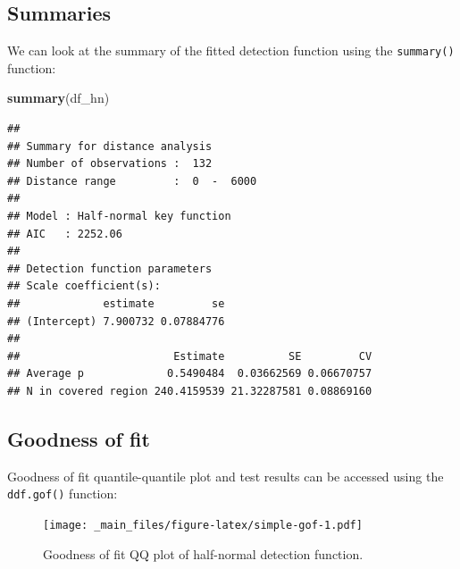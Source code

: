 \documentclass[]{book}
\newenvironment{Shaded}{\begin{snugshade}}{\end{snugshade}}
\newcommand{\KeywordTok}[1]{\textcolor[rgb]{0.13,0.29,0.53}{\textbf{#1}}}
\newcommand{\OperatorTok}[1]{\textcolor[rgb]{0.81,0.36,0.00}{\textbf{#1}}}
\newcommand{\NormalTok}[1]{#1}
\theoremstyle{definition}
\theoremstyle{definition}
\theoremstyle{remark}
\begin{document}
\subsection{Summaries}\label{summaries}

We can look at the summary of the fitted detection function using the
\texttt{summary()} function:

\begin{Shaded}
\begin{Highlighting}[]
\KeywordTok{summary}\NormalTok{(df_hn)}
\end{Highlighting}
\end{Shaded}

\begin{verbatim}
## 
## Summary for distance analysis 
## Number of observations :  132 
## Distance range         :  0  -  6000 
## 
## Model : Half-normal key function 
## AIC   : 2252.06 
## 
## Detection function parameters
## Scale coefficient(s):  
##             estimate         se
## (Intercept) 7.900732 0.07884776
## 
##                        Estimate          SE         CV
## Average p             0.5490484  0.03662569 0.06670757
## N in covered region 240.4159539 21.32287581 0.08869160
\end{verbatim}

\subsection{Goodness of fit}\label{goodness-of-fit}

Goodness of fit quantile-quantile plot and test results can be accessed
using the \texttt{ddf.gof()} function:

\begin{Shaded}
\end{Shaded}

\begin{figure}
\centering
\texttt{[image: \_main\_files/figure-latex/simple-gof-1.pdf]}
\caption{\label{fig:simple-gof}Goodness of fit QQ plot of half-normal
detection function.}
\end{figure}
\end{document}
